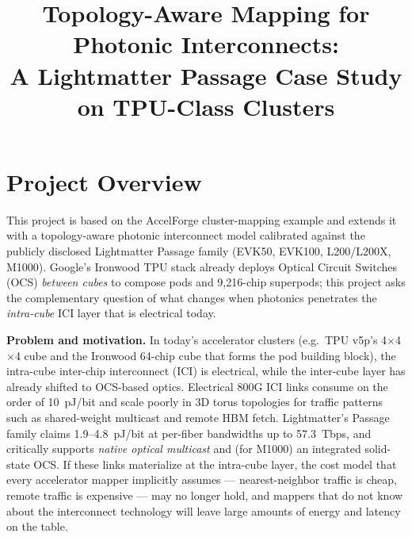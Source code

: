 \documentclass[conference,onecolumn]{IEEEtran}
\begin{document}
\title{Topology-Aware Mapping for Photonic Interconnects:\\
A Lightmatter Passage Case Study on TPU-Class Clusters}

\author{
\and
{}
}

\maketitle


\section{Project Overview}
This project is based on the AccelForge cluster-mapping example and extends it
with a topology-aware photonic interconnect model calibrated against the
publicly disclosed Lightmatter Passage family (EVK50, EVK100, L200/L200X,
M1000). Google's Ironwood TPU stack already deploys Optical Circuit Switches
(OCS) \emph{between cubes} to compose pods and 9{,}216-chip superpods; this
project asks the complementary question of what changes when photonics
penetrates the \emph{intra-cube} ICI layer that is electrical today.

\textbf{Problem and motivation.}
In today's accelerator clusters (e.g.\ TPU v5p's 4$\times$4$\times$4 cube and
the Ironwood 64-chip cube that forms the pod building block), the intra-cube
inter-chip interconnect (ICI) is electrical, while the inter-cube layer has
already shifted to OCS-based optics. Electrical 800G ICI links consume on the
order of 10~pJ/bit and scale poorly in 3D torus topologies for traffic
patterns such as shared-weight multicast and remote HBM fetch. Lightmatter's
Passage family claims 1.9--4.8~pJ/bit at per-fiber bandwidths up to
57.3~Tbps, and critically supports \emph{native optical multicast} and
(for M1000) an integrated solid-state OCS. If these links materialize at the
intra-cube layer, the cost model that every accelerator mapper implicitly
assumes --- nearest-neighbor traffic is cheap, remote traffic is expensive
--- may no longer hold, and mappers that do not know about the interconnect
technology will leave large amounts of energy and latency on the table.
\end{document}

